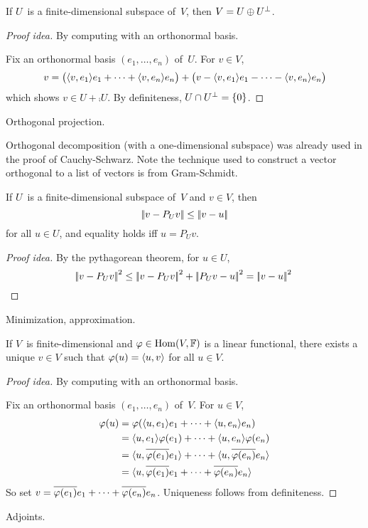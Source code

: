 \begin{thm}
If \(U\)~is a finite-dimensional subspace of~\(V\), then \(V=U\oplus{U}^{\perp}\).
\end{thm}
\begin{proof}[Proof idea]
By computing with an orthonormal basis.

Fix an orthonormal basis \((e_1,\ldots,e_n)\) of~\(U\). For \(v\in V\),
\[v=\bigl(\langle{v},{e_1}\rangle e_1+\cdots+\langle{v},{e_n}\rangle e_n\bigr)+\bigl(v-\langle{v},{e_1}\rangle e_1-\cdots-\langle{v},{e_n}\rangle e_n\bigr)\]
which shows \(v\in U+\comp{U}\). By definiteness, \(U\cap{U}^{\perp}=\{0\}\).
\end{proof}
\begin{app}
Orthogonal projection.
\end{app}
\begin{rmk}
Orthogonal decomposition (with a one-dimensional subspace) was already used in the proof of Cauchy-Schwarz. Note the technique used to construct a vector orthogonal to a list of vectors is from Gram-Schmidt.
\end{rmk}

\begin{thm}
If \(U\)~is a finite-dimensional subspace of~\(V\) and \(v\in V\), then
\[\left|\!\left|{v-P_Uv}\right|\!\right|\le\left|\!\left|{v-u}\right|\!\right|\]
for all \(u\in U\), and equality holds iff \(u=P_Uv\).
\end{thm}
\begin{proof}[Proof idea]
By the pythagorean theorem, for \(u\in U\),
\begin{equation*}
\norm{v-P_Uv}^2\le\norm{v-P_Uv}^2+\norm{P_Uv-u}^2=\norm{v-u}^2\qedhere
\end{equation*}
\end{proof}
\begin{app}
Minimization, approximation.
\end{app}

\begin{thm}
If \(V\)~is finite-dimensional and \(\varphi\in\operatorname{Hom}(V,\mathbb{F})\) is a linear functional, there exists a unique \(v\in V\) such that \(\varphi(u)=\langle{u},{v}\rangle\) for all \(u\in V\).
\end{thm}
\begin{proof}[Proof idea]
By computing with an orthonormal basis.

Fix an orthonormal basis \((e_1,\ldots,e_n)\) of~\(V\). For \(u\in V\),
\begin{align*}
\varphi(u)&=\varphi(\langle{u},{e_1}\rangle e_1+\cdots+\langle{u},{e_n}\rangle e_n)\\
	&=\langle{u},{e_1}\rangle\varphi(e_1)+\cdots+\langle{u},{e_n}\rangle\varphi(e_n)\\
	&=\langle{u},{\overline{\varphi(e_1)}e_1}\rangle+\cdots+\langle{u},{\overline{\varphi(e_n)}e_n}\rangle\\
	&=\langle{u},{\overline{\varphi(e_1)}e_1+\cdots+\overline{\varphi(e_n)}e_n}\rangle
\end{align*}
So set \(v=\overline{\varphi(e_1)}e_1+\cdots+\overline{\varphi(e_n)}e_n\). Uniqueness follows from definiteness.
\end{proof}
\begin{app}
Adjoints.
\end{app}

